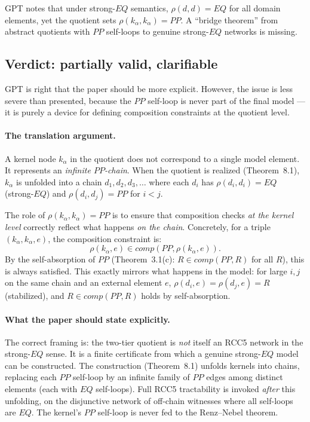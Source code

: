 \documentclass[11pt]{article}
\newcommand{\PP}{\mathit{PP}}
\newcommand{\EQ}{\mathit{EQ}}
\newcommand{\comp}{\mathit{comp}}
\begin{document}
GPT notes that under strong-$\EQ$ semantics, $\rho(d, d) = \EQ$ for all
domain elements, yet the quotient sets $\rho(k_\alpha, k_\alpha) = \PP$.
A ``bridge theorem'' from abstract quotients with $\PP$ self-loops to
genuine strong-$\EQ$ networks is missing.

\subsection{Verdict: partially valid, clarifiable}

GPT is right that the paper should be more explicit.  However, the issue
is less severe than presented, because the $\PP$ self-loop is never part
of the final model --- it is purely a device for defining composition
constraints at the quotient level.

\paragraph{The translation argument.}
A kernel node $k_\alpha$ in the quotient does not correspond to a single
model element.  It represents an \emph{infinite $\PP$-chain}.  When the
quotient is realized (Theorem~8.1), $k_\alpha$ is unfolded into a chain
$d_1, d_2, d_3, \ldots$ where each $d_i$ has $\rho(d_i, d_i) = \EQ$
(strong-$\EQ$) and $\rho(d_i, d_j) = \PP$ for $i < j$.

The role of $\rho(k_\alpha, k_\alpha) = \PP$ is to ensure that
composition checks \emph{at the kernel level} correctly reflect what
happens \emph{on the chain}.  Concretely, for a triple
$(k_\alpha, k_\alpha, e)$, the composition constraint is:
\[
\rho(k_\alpha, e) \in \comp(\PP, \rho(k_\alpha, e)).
\]
By the self-absorption of $\PP$ (Theorem~3.1(c): $R \in \comp(\PP, R)$
for all $R$), this is always satisfied.  This exactly mirrors what
happens in the model: for large $i, j$ on the same chain and an external
element $e$, $\rho(d_i, e) = \rho(d_j, e) = R$ (stabilized), and
$R \in \comp(\PP, R)$ holds by self-absorption.

\paragraph{What the paper should state explicitly.}
The correct framing is: the two-tier quotient is \emph{not} itself an
RCC5 network in the strong-$\EQ$ sense.  It is a finite certificate from
which a genuine strong-$\EQ$ model can be constructed.  The construction
(Theorem~8.1) unfolds kernels into chains, replacing each $\PP$ self-loop
by an infinite family of $\PP$ edges among distinct elements (each with
$\EQ$ self-loops).  Full RCC5 tractability is invoked \emph{after} this
unfolding, on the disjunctive network of off-chain witnesses where all
self-loops are $\EQ$.  The kernel's $\PP$ self-loop is never fed to the
Renz--Nebel theorem.
\end{document}
